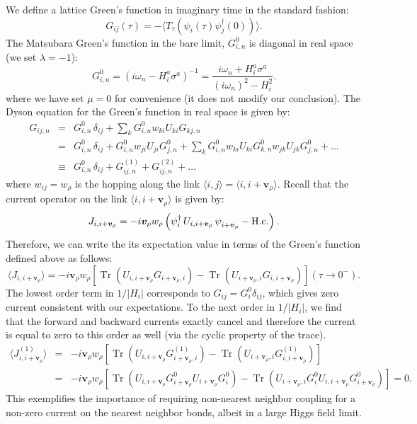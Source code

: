 \documentclass[aps,prb,preprint,onecolumn,citeautoscript,superscriptaddress,footinbib,
eqsecnum]{revtex4-1}
\newcommand{\beq}{\begin{equation}}
\newcommand{\eeq}{\end{equation}}
\def\bea{\begin{eqnarray}}
\def\eea{\end{eqnarray}}
\def \vr{{\bm v}_\rho}
\def \on{{\omega_n}}
\def \sa{{\sigma^a}}
\DeclareMathOperator{\Tr}{Tr}
\newcommand{\nn}{\nonumber \\}
\begin{document}
We define a lattice Green's function in imaginary time in the standard fashion:
 \beq
 G_{ij}(\tau) = - \langle T_{\tau} (\psi_{i}(\tau) \psi_j^\dagger(0)) \rangle.
 \eeq
The Matsubara Green's function in the bare limit, $G^0_{i,n}$ is diagonal in real space (we set $\lambda = -1$):
\beq
G^0_{i,n} = (i\on - H_i^a \sa)^{-1} = \frac{i\on + H_i^a \sa}{(i \on)^2 - H_i^2}.
\eeq
 where we have set $\mu = 0$ for convenience (it does not modify our conclusion).
The Dyson equation for the Green's function in real space is given by:
 \bea
 G_{ij,n} &=& G^0_{i,n} \, \delta_{ij} + \sum_{k} G^0_{i,n} w_{ki}  U_{ki} G_{kj,n} \nn
 &=& G^0_{i,n} \, \delta_{ij} +  G^0_{i,n}  w_{ji} U_{ji} G^0_{j,n} + \sum_{k} G^0_{i,n} w_{ki} U_{ki} G^0_{k,n} w_{jk} U_{jk} G^{0}_{j,n} + ... \nn
 &\equiv& G^0_{i,n} \, \delta_{ij} + G^{(1)}_{ij,n} + G^{(2)}_{ij,n} + ...
 \eea
 where $w_{ij} = w_\rho$ is the hopping along the link $\langle i,j \rangle = \langle i, i + \vr \rangle$. Recall that the current operator  on the link $\langle i, i + \vr \rangle$ is given by:
\beq
J_{i, i + \vr} =  - i \vr w_\rho \left(  \psi_{i}^\dagger  \, U_{i,i+\vr} \, \psi_{i + {\bm v}_\rho}^{\vphantom \dagger}  - \mbox{H.c.} \right).
\eeq
Therefore, we can write the its expectation value in terms of the Green's function defined above as follows:
\beq
\langle J_{i, i + \vr}  \rangle  = - i \vr w_\rho \left[ \Tr(U_{i,i+\vr} G_{i + \vr,i}) - \Tr(U_{i+\vr,i} G_{i,i + \vr}) \right](\tau \rightarrow 0^-).
\eeq
The lowest order term in $1/|H_i|$ corresponds to $G_{ij} = G^0_{i}\delta_{ij}$, which gives zero current consistent with our expectations. To the next order in $1/|H_i|$, we find that the forward and backward currents exactly cancel and therefore the current is equal to zero to this order as well (via the cyclic property of the trace). 
\bea
\langle J^{(1)}_{i, i + \vr}  \rangle &=& - i \vr w_\rho \left[ \Tr(U_{i,i+\vr} G^{(1)}_{i + \vr,i}) - \Tr(U_{i+\vr,i} G^{(1)}_{i,i + \vr}) \right] \nn 
 &=& - i \vr w_\rho  \left[ \Tr(U_{i,i+\vr} G^0_{i + \vr} U_{i + \vr} G^0_i) - \Tr(U_{i+\vr,i} G^0_i U_{i,i + \vr} G^0_{i + \vr}) \right] = 0.
\eea
This exemplifies the importance of requiring non-nearest neighbor coupling for a non-zero current on the nearest neighbor bonds, albeit in a large Higgs field limit. 
\end{document}

